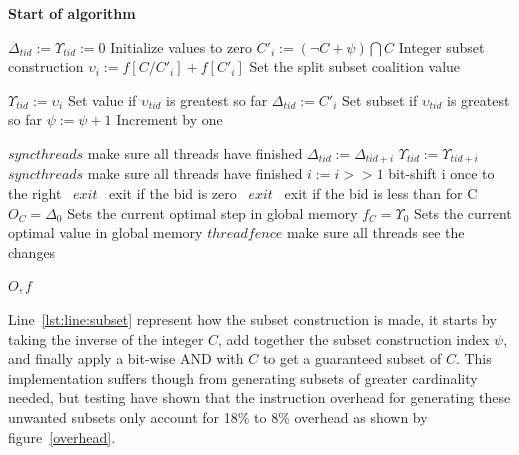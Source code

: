 \documentclass[a4paper, 12pt]{report}
\begin{document}
\textbf{Start of algorithm}
\begin{algorithmic}[1]
\STATE $\Delta _{tid} := \Upsilon _{tid} := 0$ \hfill Initialize values to zero
\IF{$\psi \leq \Psi$} 
\STATE $C'_{i} := (\neg C+\psi) \bigcap C$ \label{lst:line:subset} \hfill Integer subset construction
\STATE $\upsilon _{i} := f[C/C'_{i}]+f[C'_{i}]$ \hfill Set the split subset coalition value
\ENDIF 

\STATE $\Upsilon _{tid} := \upsilon _{i}$  \hfill Set value if $\upsilon _{tid}$ is greatest so far
\STATE $\Delta _{tid} := C'_{i}$ \hfill Set subset if $\upsilon _{tid}$ is greatest so far
\ENDIF
\STATE $\psi := \psi + 1$ \hfill Increment by one
\ENDFOR
\ENDIF

\STATE $syncthreads$ \hfill make sure all threads have finished
 \label{lst:line:mid}
 \label{lst:line:midmid}
 \label{lst:line:midmidmid}
\STATE $\Delta _{tid} := \Delta _{tid+i}$ 
\STATE $\Upsilon _{tid} := \Upsilon _{tid+i}$
\ENDIF
\ENDIF
\STATE $syncthreads$ \hfill make sure all threads have finished
\STATE $i := i >> 1$ \hfill bit-shift i once to the right \label{lst:line:midlast}
\ENDFOR \label{lst:line:midend}
 \label{lst:line:last}
\STATE{} \algorithmicthen\ {$ exit$}
\algorithmicend\ \algorithmicif \hfill exit if the bid is zero
\STATE{} \algorithmicthen\ {$ exit$} 
\algorithmicend\ \algorithmicif \hfill exit if the bid is less than for C
  \label{lst:line:lastmid}
\STATE $O_C = \Delta _0$ \hfill Sets the current optimal step in global memory
\STATE $f_C = \Upsilon _0$ \hfill Sets the current optimal value in global memory
\STATE $threadfence$ \hfill make sure all threads see the changes
\ENDIF 

\ENDIF \label{lst:line:lastend}
\RETURN $O,f$
\end{algorithmic}
Line~\ref{lst:line:subset} represent how the subset construction is made, it starts by taking the inverse of the integer $C$, 
add together the subset construction index $\psi$, and finally apply a bit-wise AND with $C$ to get a guaranteed subset of $C$.
This implementation suffers though from generating subsets of greater cardinality needed, 
but testing have shown that the instruction overhead for generating these unwanted subsets only account for 18\% to 8\% overhead as shown by figure~\ref{overhead}.
\end{document}
